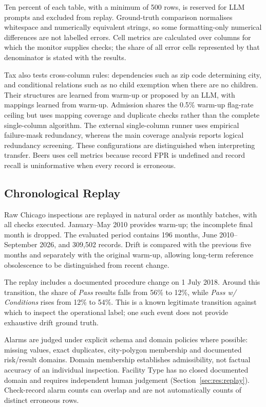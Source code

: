 Ten percent of each table, with a minimum of 500 rows, is reserved for LLM prompts and excluded from replay. Ground-truth comparison normalises whitespace and numerically equivalent strings, so some formatting-only numerical differences are not labelled errors. Cell metrics are calculated over columns for which the monitor supplies checks; the share of all error cells represented by that denominator is stated with the results.

Tax also tests cross-column rules: dependencies such as zip code determining city, and conditional relations such as no child exemption when there are no children. Their structures are learned from warm-up or proposed by an LLM, with mappings learned from warm-up. Admission shares the 0.5\% warm-up flag-rate ceiling but uses mapping coverage and duplicate checks rather than the complete single-column algorithm. The external single-column runner uses empirical failure-mask redundancy, whereas the main coverage analysis reports logical redundancy screening. These configurations are distinguished when interpreting transfer. Beers uses cell metrics because record FPR is undefined and record recall is uninformative when every record is erroneous.

\subsection{Chronological Replay}
\label{sec:design:replay}

Raw Chicago inspections are replayed in natural order as monthly batches, with all checks executed. January--May 2010 provides warm-up; the incomplete final month is dropped. The evaluated period contains 196 months, June 2010--September 2026, and 309,502 records. Drift is compared with the previous five months and separately with the original warm-up, allowing long-term reference obsolescence to be distinguished from recent change.

The replay includes a documented procedure change on 1 July 2018. Around this transition, the share of \emph{Pass} results falls from 56\% to 12\%, while \emph{Pass w/ Conditions} rises from 12\% to 54\%. This is a known legitimate transition against which to inspect the operational label; one such event does not provide exhaustive drift ground truth.

Alarms are judged under explicit schema and domain policies where possible: missing values, exact duplicates, city-polygon membership and documented risk/result domains. Domain membership establishes admissibility, not factual accuracy of an individual inspection. Facility Type has no closed documented domain and requires independent human judgement (Section~\ref{sec:res:replay}). Check-record alarm counts can overlap and are not automatically counts of distinct erroneous rows.

